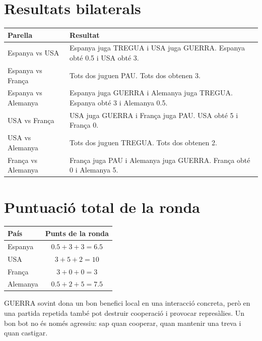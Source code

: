 \documentclass[12pt,a4paper]{report}
\begin{document}
\section{Resultats bilaterals}

\begin{center}
\begin{tabularx}{\textwidth}{l Y}
\toprule
Parella & Resultat \\
\midrule
Espanya vs USA & Espanya juga TREGUA i USA juga GUERRA. Espanya obté 0.5 i USA obté 3. \\
Espanya vs França & Tots dos juguen PAU. Tots dos obtenen 3. \\
Espanya vs Alemanya & Espanya juga GUERRA i Alemanya juga TREGUA. Espanya obté 3 i Alemanya 0.5. \\
USA vs França & USA juga GUERRA i França juga PAU. USA obté 5 i França 0. \\
USA vs Alemanya & Tots dos juguen TREGUA. Tots dos obtenen 2. \\
França vs Alemanya & França juga PAU i Alemanya juga GUERRA. França obté 0 i Alemanya 5. \\
\bottomrule
\end{tabularx}
\end{center}

\section{Puntuació total de la ronda}

\begin{center}
\begin{tabular}{lc}
\toprule
\textbf{País} & \textbf{Punts de la ronda} \\
\midrule
Espanya & \(0.5 + 3 + 3 = 6.5\) \\
USA & \(3 + 5 + 2 = 10\) \\
França & \(3 + 0 + 0 = 3\) \\
Alemanya & \(0.5 + 2 + 5 = 7.5\) \\
\bottomrule
\end{tabular}
\end{center}

\begin{tcolorbox}[colback=softgray,colframe=black,title=Què ens ensenya aquest exemple]
GUERRA sovint dona un bon benefici local en una interacció concreta, però en una
partida repetida també pot destruir cooperació i provocar represàlies. Un bon
bot no és només agressiu: sap quan cooperar, quan mantenir una treva i quan
castigar.
\end{tcolorbox}
\end{document}
